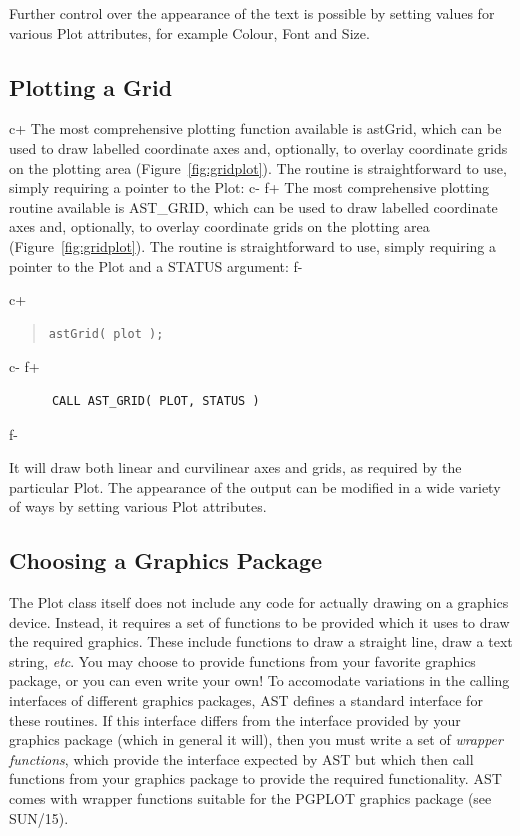 \documentclass[twoside,11pt]{article}
\newcommand{\xref}[3]{#1}
\begin{document}
Further control over the appearance of the text is possible by setting
values for various Plot attributes, for example Colour, Font and Size.

\subsection{\label{ss:plottingagrid}Plotting a Grid}

c+
The most comprehensive plotting function available is astGrid, which
can be used to draw labelled coordinate axes and, optionally, to
overlay coordinate grids on the plotting area
(Figure~\ref{fig:gridplot}). The routine is straightforward to use,
simply requiring a pointer to the Plot:
c-
f+
The most comprehensive plotting routine available is AST\_GRID, which
can be used to draw labelled coordinate axes and, optionally, to
overlay coordinate grids on the plotting area
(Figure~\ref{fig:gridplot}). The routine is straightforward to use,
simply requiring a pointer to the Plot and a STATUS argument:
f-

c+
\begin{quote}
\small
\begin{verbatim}
astGrid( plot );
\end{verbatim}
\normalsize
\end{quote}
c-
f+
\small
\begin{verbatim}
      CALL AST_GRID( PLOT, STATUS )
\end{verbatim}
\normalsize
f-

It will draw both linear and curvilinear axes and grids, as required
by the particular Plot. The appearance of the output can be modified
in a wide variety of ways by setting various Plot attributes.

\subsection{\label{ss:choosingagraphicspackage}Choosing a Graphics Package}
The Plot class itself does not include any code for actually drawing on a
graphics device. Instead, it requires a set of functions to be provided
which it uses to draw the required graphics. These include functions
to draw a straight line, draw a text string, \emph{etc}. You may choose
to provide functions from your favorite graphics package, or you can even
write your own! To accomodate variations in the calling interfaces of
different graphics packages, AST defines a standard interface for these
routines. If this interface differs from the interface provided by your
graphics package (which in general it will), then you must write a set of
\emph{wrapper functions}, which provide the interface expected by AST but
which then call functions from your graphics package to provide the
required functionality. AST comes with wrapper functions suitable for
the PGPLOT graphics package (see \xref{SUN/15}{sun15}{}).
\end{document}
